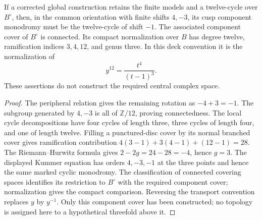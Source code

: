 \begin{proposition}\label{push:src:B.3.2}\label{push:B32}
If a corrected global construction retains the
finite models and a twelve-cycle over
$B^\circ$, then, in the common orientation
with finite shifts $4,-3$, its cusp
component monodromy must be the twelve-cycle
of shift $-1$. The associated component
cover of $B^\circ$ is connected. Its compact
normalization over $B$ has degree twelve,
ramification indices $3,4,12$, and genus
three. In this deck convention it is the
normalization of
\[
 y^{12}=\frac{t^4}{(t-1)^3}.
\]
These assertions do not construct
the required central complex space.
\end{proposition}
\begin{proof}
The peripheral relation gives the remaining
rotation as $-4+3=-1$. The subgroup generated
by $4,-3$ is all of $\mathbb Z/12$, proving
connectedness. The local cycle decompositions
have four cycles of length three, three
cycles of length four, and one of length
twelve. Filling a punctured-disc cover by
its normal branched cover gives ramification
contribution
$4(3-1)+3(4-1)+(12-1)=28$.
The Riemann--Hurwitz formula gives
$2-2g=24-28=-4$, hence $g=3$.
The displayed Kummer equation has orders
$4,-3,-1$ at the three points and hence
the same marked cyclic monodromy. The
classification of connected covering
spaces identifies its restriction to
$B^\circ$ with the required component
cover; normalization gives the compact
comparison. Reversing the transport
convention replaces $y$ by $y^{-1}$.
Only this component cover has been
constructed; no topology is assigned here
to a hypothetical threefold above it.
\end{proof}

